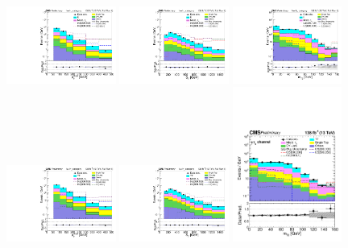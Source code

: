 \documentclass[12pt, a4paper]{article}
\begin{document}
\begin{figure}[htb!]
	\includegraphics[width=0.32\textwidth]{Fig/Met_1E1Tau_FullRun2.pdf}
	\includegraphics[width=0.32\textwidth]{Fig/Ht_1E1Tau_FullRun2.pdf}
	\includegraphics[width=0.32\textwidth]{Fig/Mt2_1E1Tau_FullRun2.pdf}\\
	\includegraphics[width=0.32\textwidth]{Fig/Met_1Mu1Tau_FullRun2.pdf}
	\includegraphics[width=0.32\textwidth]{Fig/Ht_1Mu1Tau_FullRun2.pdf}
	\includegraphics[width=0.32\textwidth]{Fig/Mt2_1Mu1Tau_FullRun2.pdf}

\end{figure}
\end{document}
